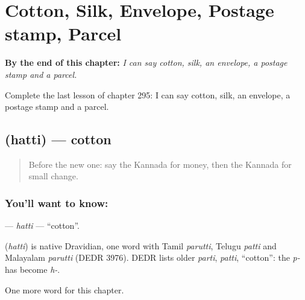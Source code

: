 
\chapter{Cotton, Silk, Envelope, Postage stamp, Parcel}
\label{ch:ka-cotton-silk-envelope-postage-stamp-parcel}

\begin{chapteropening}
\textbf{By the end of this chapter:} \emph{I can say cotton, silk, an envelope, a postage stamp and a parcel.}

Complete the last lesson of chapter 295: I can say cotton, silk, an envelope, a postage stamp and a parcel.
\end{chapteropening}

\section[\texorpdfstring{\kn{ಹತ್ತಿ} (hatti)}{ಹತ್ತಿ (hatti)}]{ (hatti) — cotton}

\label{lesson:KA-C295-hatti}



\begin{quote}
Before the new one: say the Kannada for money, then the Kannada for small change.
\end{quote}

\subsection*{You'll want to know: }
\textbf{} — \emph{hatti} — \textquotedblleft{}cotton\textquotedblright{}.

\begin{cousinweb}
\textbf{} (\emph{hatti}) is native Dravidian, one word with Tamil \emph{parutti}, Telugu \emph{patti} and Malayalam \emph{parutti} (DEDR 3976). DEDR lists older \emph{parti}, \emph{patti}, \textquotedblleft{}cotton\textquotedblright{}: the \emph{p-} has become \emph{h-}.
\end{cousinweb}

\begin{grammarlens}[title={What you've built}]
One more word for this chapter.
\end{grammarlens}

